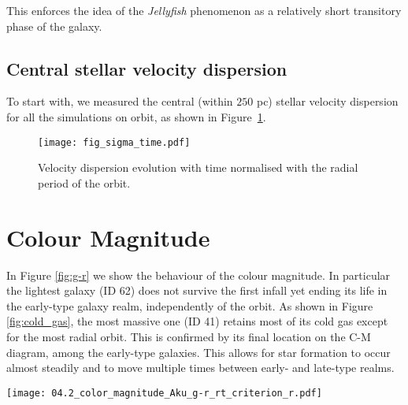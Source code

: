This enforces the idea of the \emph{Jellyfish} phenomenon as a relatively short transitory phase of the galaxy. 


\subsection{Central stellar velocity dispersion}
To start with, we measured the central (within $250$ pc) stellar velocity dispersion for all the simulations on orbit, as shown in Figure~\ref{fig:sigma}.

\begin{figure}
\centering
\texttt{[image: fig\_sigma\_time.pdf]}
\caption{Velocity dispersion evolution with time normalised with the radial period of the orbit.
}
\label{fig:sigma}
\end{figure}


\section{Colour Magnitude}
In Figure \ref{fig:g-r} we show the behaviour of the colour magnitude.
In particular the lightest galaxy (ID 62) does not survive the first infall yet ending its life in the early-type galaxy realm, independently of the orbit.
As shown in Figure \ref{fig:cold_gas}, the most massive one (ID 41) retains most of its cold gas except for the most radial orbit.
This is confirmed by its final location on the C-M diagram, among the early-type galaxies.
This allows for star formation to occur almost steadily and to move multiple times between early- and late-type realms.


\begin{sidewaysfigure}
\centering
\texttt{[image: 04.2\_color\_magnitude\_Aku\_g-r\_rt\_criterion\_r.pdf]}
\caption{SDSS bands colour magnitude diagram of galaxies on different orbits compared to Fornax dwarf catalogue of \citet{Venhola2019}.
Red and blue colour for the data points in the background represent dwarf elliptical (dE) and late type galaxy respectively, classified by eye on the base of morphology. Empty squares are nucleated dE.
Data tracks of simulated galaxies are shown overlaid colour coded by the clustercentric radius.
The tracks are limited to bound galaxies (i.e. they are drawn with snapshots for which condition \eqref{eq:tidal_radius_condition} holds).
}
\label{fig:g-r}
\end{sidewaysfigure}

